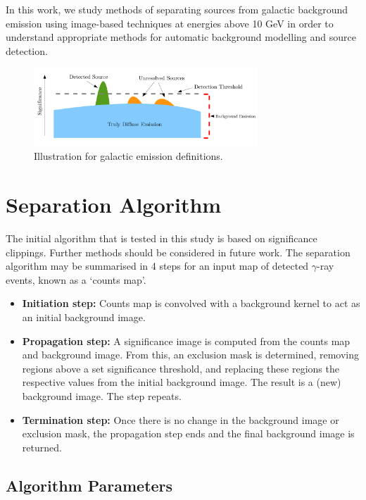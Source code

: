 \documentclass{PoS}
\begin{document}
In this work, we study methods of separating sources from galactic background emission using image-based techniques at energies above 10 GeV in order to understand appropriate methods for automatic background modelling and source detection.

\begin{figure}[h!]
  \centering
      \includegraphics[width=0.75\textwidth]{figures/definitions.png}
  \caption{Illustration for galactic emission definitions.}
\end{figure}

\section{Separation Algorithm}


The initial algorithm that is tested in this study is based on significance clippings. Further methods should be considered in future work. The separation algorithm may be summarised in 4 steps for an input map of detected $\gamma$-ray events, known as a `counts map'.

\begin{itemize}
\item{\textbf{Initiation step:} Counts map is convolved with a background kernel to act as an initial background image.}
\item{\textbf{Propagation step:} A significance image is computed from the counts map and background image. From this, an exclusion mask is determined, removing regions above a set significance threshold, and replacing these regions the respective values from the initial background image. The result is a (new) background image. The step repeats.}
\item{\textbf{Termination step:} Once there is no change in the background image or exclusion mask, the propagation step ends and the final background image is returned.}
\end{itemize}


\subsection{Algorithm Parameters}
\end{document}
